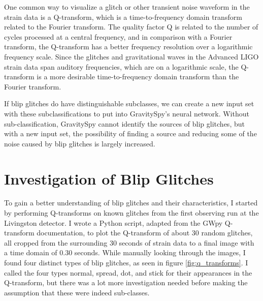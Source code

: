 \documentclass[a4paper]{article}
\begin{document}
One common way to visualize a glitch or other transient noise waveform in the strain data is a Q-transform, which is a time-to-frequency domain transform related to the Fourier transform. The quality factor Q is related to the number of cycles processed at a central frequency, and in comparison with a Fourier transform, the Q-transform has a better frequency resolution over a logarithmic frequency scale. Since the glitches and gravitational waves in the Advanced LIGO strain data span auditory frequencies, which are on a logarithmic scale, the Q-transform is a more desirable time-to-frequency domain transform than the Fourier transform. 

If blip glitches do have distinguishable subclasses, we can create a new input set with these subclassifications to put into GravitySpy's neural network. Without sub-classification, GravitySpy cannot identify the sources of blip glitches, but with a new input set, the possibility of finding a source and reducing some of the noise caused by blip glitches is largely increased. 

\section{Investigation of Blip Glitches} \label{investigation}

To gain a better understanding of blip glitches and their characteristics, I started by performing Q-transforms on known glitches from the first observing run at the Livingston detector. I wrote a Python script, adapted from the GWpy Q-transform documentation, to plot the Q-transform of about 30 random glitches, all cropped from the surrounding 30 seconds of strain data to a final image with a time domain of 0.30 seconds. While manually looking through the images, I found four distinct types of blip glitches, as seen in figure \ref{fig:q_transforms}. I called the four types normal, spread, dot, and stick for their appearances in the Q-transform, but there was a lot more investigation needed before making the assumption that these were indeed sub-classes.
\end{document}
